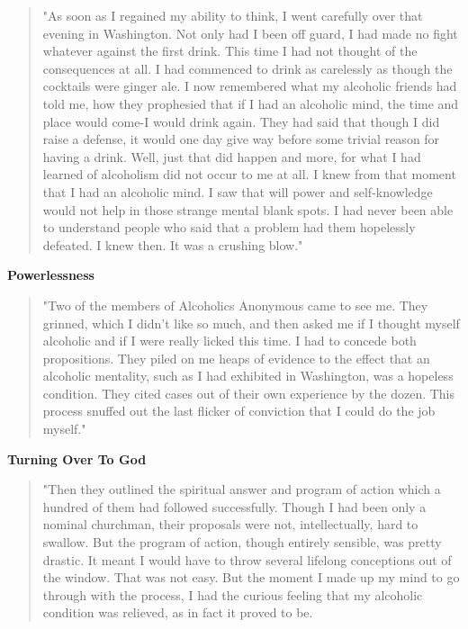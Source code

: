 \begin{biblechatper}
\begin{biblechatper}
\begin{biblechatper}
\begin{biblechatper}
\begin{biblechatper}
\begin{biblechatper}
\begin{biblechatper}
\begin{biblechatper}
\begin{biblechatper}
\begin{biblechatper}
\begin{biblechatper}
\begin{biblechatper}
\begin{biblechatper}
\begin{quote}
"As soon as I regained my ability to think, I went carefully over that evening in Washington. 
Not only had I been off guard, I had made no fight whatever against the first drink. 
This time I had not thought of the consequences at all. 
I had commenced to drink as carelessly as though the cocktails were ginger ale. 
I now remembered what my alcoholic friends had told me, 
how they prophesied that if I had an alcoholic mind, 
the time and place would come-I would drink again. 
They had said that though I did raise a defense, 
it would one day give way before some trivial reason for having a drink. 
Well, just that did happen and more, 
for what I had learned of alcoholism did not occur to me at all. 
I knew from that moment that I had an alcoholic mind. 
I saw that will power and self-knowledge would not help in those strange mental blank spots. 
I had never been able to understand people who said that a problem had them hopelessly defeated. 
I knew then. 
It was a crushing blow."
\end{quote}

\textbf{Powerlessness}

\begin{quote}
"Two of the members of Alcoholics Anonymous came to see me. 
They grinned, which I didn't like so much, 
and then asked me if I thought myself alcoholic and if I were really licked this time. 
I had to concede both propositions. 
They piled on me heaps of evidence to the effect that an alcoholic mentality, 
such as I had exhibited in Washington, was a hopeless condition. 
They cited cases out of their own experience by the dozen. 
This process snuffed out the last flicker of conviction that I could do the job myself."
\end{quote}

\textbf{Turning Over To God}

\begin{quote}
"Then they outlined the spiritual answer and program of action which a hundred of them had followed successfully. 
Though I had been only a nominal churchman, their proposals were not, intellectually, hard to swallow. 
But the program of action, though entirely sensible, was pretty drastic. 
It meant I would have to throw several lifelong conceptions out of the window. 
That was not easy. 
But the moment I made up my mind to go through with the process, 
I had the curious feeling that my alcoholic condition was relieved, 
as in fact it proved to be.
\end{quote}


\end{biblechatper}
\end{biblechatper}
\end{biblechatper}
\end{biblechatper}
\end{biblechatper}
\end{biblechatper}
\end{biblechatper}
\end{biblechatper}
\end{biblechatper}
\end{biblechatper}
\end{biblechatper}
\end{biblechatper}
\end{biblechatper}
